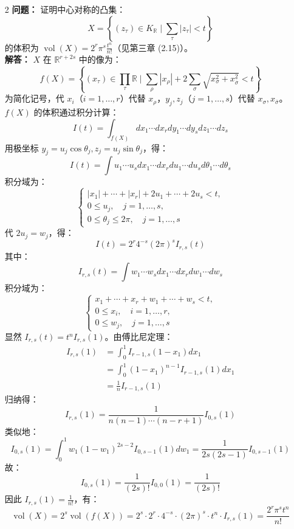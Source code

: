 \documentclass[UTF8]{ctexart}
\begin{document}
\begin{enumerate}
\begin{enumerate}
\item[2] 
\textbf{问题：} 证明中心对称的凸集：
\[
X = \left\{(z_\tau) \in K_{\mathbb{R}} \mid \sum_\tau |z_\tau| < t\right\}
\]
的体积为 \(\operatorname{vol}(X) = 2^r \pi^s \frac{t^n}{n!}\)（见第三章 (2.15)）。\\
\textbf{解答：} \(X\) 在 \(\mathbb{R}^{r+2s}\) 中的像为：
\[
f(X) = \left\{(x_\tau) \in \prod_\tau \mathbb{R} \mid \sum_\rho |x_\rho| + 2 \sum_\sigma \sqrt{x_\sigma^2 + x_{\bar{\sigma}}^2} < t\right\}
\]
为简化记号，代 \(x_i\)（\(i = 1, \dots, r\)）代替 \(x_\rho\)，\(y_j, z_j\)（\(j = 1, \dots, s\)）代替 \(x_\sigma, x_{\bar{\sigma}}\)。\(f(X)\) 的体积通过积分计算：
\[
I(t) = \int_{f(X)} dx_1 \cdots dx_r dy_1 \cdots dy_s dz_1 \cdots dz_s
\]
用极坐标 \(y_j = u_j \cos \theta_j, z_j = u_j \sin \theta_j\)，得：
\[
I(t) = \int u_1 \cdots u_s dx_1 \cdots dx_r du_1 \cdots du_s d\theta_1 \cdots d\theta_s
\]
积分域为：
\[
\begin{cases}
|x_1| + \cdots + |x_r| + 2u_1 + \cdots + 2u_s < t, \\
0 \leq u_j, \quad j = 1, \dots, s, \\
0 \leq \theta_j \leq 2\pi, \quad j = 1, \dots, s
\end{cases}
\]
代 \(2u_j = w_j\)，得：
\[
I(t) = 2^r 4^{-s} (2\pi)^s I_{r,s}(t)
\]
其中：
\[
I_{r,s}(t) = \int w_1 \cdots w_s dx_1 \cdots dx_r dw_1 \cdots dw_s
\]
积分域为：
\[
\begin{cases}
x_1 + \cdots + x_r + w_1 + \cdots + w_s < t, \\
0 \leq x_i, \quad i = 1, \dots, r, \\
0 \leq w_j, \quad j = 1, \dots, s
\end{cases}
\]
显然 \(I_{r,s}(t) = t^n I_{r,s}(1)\)。由傅比尼定理：
\[
\begin{aligned}
I_{r,s}(1) &= \int_0^1 I_{r-1,s}(1 - x_1) dx_1 \\
&= \int_0^1 (1 - x_1)^{n-1} I_{r-1,s}(1) dx_1 \\
&= \frac{1}{n} I_{r-1,s}(1)
\end{aligned}
\]
归纳得：
\[
I_{r,s}(1) = \frac{1}{n(n-1) \cdots (n-r+1)} I_{0,s}(1)
\]
类似地：
\[
I_{0,s}(1) = \int_0^1 w_1 (1 - w_1)^{2s-2} I_{0,s-1}(1) dw_1 = \frac{1}{2s(2s-1)} I_{0,s-1}(1)
\]
故：
\[
I_{0,s}(1) = \frac{1}{(2s)!} I_{0,0}(1) = \frac{1}{(2s)!}
\]
因此 \(I_{r,s}(1) = \frac{1}{n!}\)，有：
\[
\operatorname{vol}(X) = 2^s \operatorname{vol}(f(X)) = 2^s \cdot 2^r \cdot 4^{-s} \cdot (2\pi)^s \cdot t^n \cdot I_{r,s}(1) = \frac{2^r \pi^s t^n}{n!}
\]


\end{enumerate}
\end{enumerate}
\end{document}
